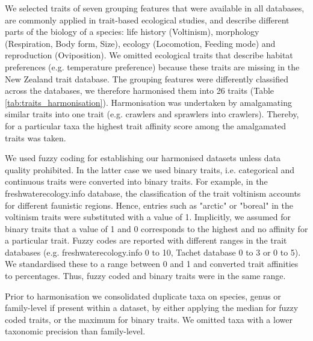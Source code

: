 \documentclass{article}
\begin{document}
We selected traits of seven grouping features that were available in all databases, are commonly applied in trait-based ecological studies, and describe different parts of the biology of a species: life history (Voltinism), morphology (Respiration, Body form, Size), ecology (Locomotion, Feeding mode) and reproduction (Oviposition). We omitted ecological traits that describe habitat preferences (e.g. temperature preference) because these traits are missing in the New Zealand trait database. The grouping features were differently classified across the databases, we therefore harmonised them into 26 traits (Table \ref{tab:traits_harmonisation}). Harmonisation was undertaken by amalgamating similar traits into one trait (e.g. crawlers and sprawlers into crawlers). Thereby, for a particular taxa the highest trait affinity score among the amalgamated traits was taken. 

We used fuzzy coding for establishing our harmonised datasets unless data quality prohibited. In the latter case we used binary traits, i.e. categorical and continuous traits were converted into binary traits. For example, in the  freshwaterecology.info database, the classification of the trait voltinism accounts for different faunistic regions. Hence, entries such as "arctic" or "boreal" in the voltinism traits were substituted with a value of 1. Implicitly, we assumed for binary traits that a value of 1 and 0 corresponds to the highest and no affinity for a particular trait. Fuzzy codes are reported with different ranges in the trait databases (e.g. freshwaterecology.info 0 to 10, Tachet database 0 to 3 or 0 to 5). We standardised these to a range between 0 and 1 and converted trait affinities to percentages. Thus, fuzzy coded and binary traits were in the same range. 

Prior to harmonisation we consolidated duplicate taxa on species, genus or family-level if present within a dataset, by either applying the median for fuzzy coded traits, or the maximum for binary traits. We omitted taxa with a lower taxonomic precision than family-level.
\end{document}
